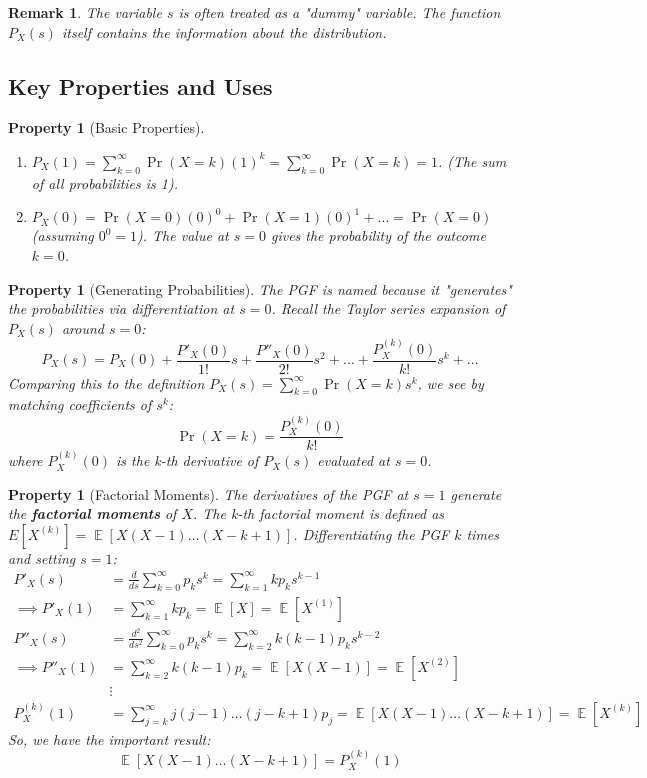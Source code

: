\documentclass[11pt, letterpaper]{article}
\newtheorem{property}[theorem]{Property}
\newtheorem{remark}[theorem]{Remark}
\DeclareMathOperator{\E}{\mathbb{E}}
\begin{document}
\begin{remark}
The variable $s$ is often treated as a "dummy" variable. The function $P_X(s)$ itself contains the information about the distribution.
\end{remark}

\subsection{Key Properties and Uses}

\begin{property}[Basic Properties]~
\begin{enumerate}
    \item $P_X(1) = \sum_{k=0}^{\infty} \Pr(X=k) (1)^k = \sum_{k=0}^{\infty} \Pr(X=k) = 1$. (The sum of all probabilities is 1).
    \item $P_X(0) = \Pr(X=0) (0)^0 + \Pr(X=1) (0)^1 + \dots = \Pr(X=0)$ (assuming $0^0=1$). The value at $s=0$ gives the probability of the outcome $k=0$.
\end{enumerate}
\end{property}

\begin{property}[Generating Probabilities]
The PGF is named because it "generates" the probabilities via differentiation at $s=0$. Recall the Taylor series expansion of $P_X(s)$ around $s=0$:
$$ P_X(s) = P_X(0) + \frac{P'_X(0)}{1!}s + \frac{P''_X(0)}{2!}s^2 + \dots + \frac{P_X^{(k)}(0)}{k!}s^k + \dots $$
Comparing this to the definition $P_X(s) = \sum_{k=0}^{\infty} \Pr(X=k) s^k$, we see by matching coefficients of $s^k$:
\begin{equation}
    \Pr(X=k) = \frac{P_X^{(k)}(0)}{k!}
\end{equation}
where $P_X^{(k)}(0)$ is the k-th derivative of $P_X(s)$ evaluated at $s=0$.
\end{property}

\begin{property}[Factorial Moments]
The derivatives of the PGF at $s=1$ generate the \textbf{factorial moments} of $X$.
The k-th factorial moment is defined as $E[X^{(k)}] = \E[X(X-1)\dots(X-k+1)]$.
Differentiating the PGF $k$ times and setting $s=1$:
\begin{align*}
    P'_X(s) &= \frac{d}{ds} \sum_{k=0}^{\infty} p_k s^k = \sum_{k=1}^{\infty} k p_k s^{k-1} \\
    \implies P'_X(1) &= \sum_{k=1}^{\infty} k p_k = \E[X] = \E[X^{(1)}] \\
    P''_X(s) &= \frac{d^2}{ds^2} \sum_{k=0}^{\infty} p_k s^k = \sum_{k=2}^{\infty} k(k-1) p_k s^{k-2} \\
    \implies P''_X(1) &= \sum_{k=2}^{\infty} k(k-1) p_k = \E[X(X-1)] = \E[X^{(2)}] \\
    &\vdots \\
    P_X^{(k)}(1) &= \sum_{j=k}^{\infty} j(j-1)\dots(j-k+1) p_j = \E[X(X-1)\dots(X-k+1)] = \E[X^{(k)}]
\end{align*}
So, we have the important result:
\begin{equation}
    \E[X(X-1)\dots(X-k+1)] = P_X^{(k)}(1)
\end{equation}
\end{property}
\end{document}
